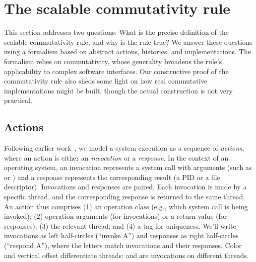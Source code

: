 
\section{The scalable commutativity rule}
\label{sec:rule}

This section addresses two questions: What is the precise
definition of the scalable commutativity rule, and why is the rule true?
%
We answer these questions using a formalism based on abstract actions, histories,
and implementations.
%
The formalism relies on \SRI commutativity, whose generality broadens
the rule's applicability to complex software interfaces.
%
Our constructive proof of the commutativity rule
also sheds some light on how real commutative implementations might be
built, though the actual construction is not very practical.



\subsection{Actions}

Following earlier work~\cite{herlihy:linearizability}, 
we model a system execution
as a sequence of \emph{actions}, where an action is either an
\emph{invocation} or a \emph{response}.
%
In the context of an operating system, an invocation represents a system
call with arguments (such as  or ) and a
response represents the corresponding result (a PID or a file
descriptor).
%
Invocations and responses are paired. Each invocation is made by a
specific thread, and the corresponding response is returned to the same
thread.
%
An action thus comprises (1) an operation class (e.g., which system
call is being invoked); (2) operation arguments (for invocations) or
a return value (for responses); (3) the relevant thread;
and (4) a tag for uniqueness.
%
We'll write invocations as left half-circles 
(``invoke A'') and responses as right half-circles
 (``respond A''), where the letters match
invocations and their responses.
%
Color and vertical offset differentiate threads:
 and  are invocations on
different threads.

\def\historyexample{%
\scpi{A}{1}
\scpi{B}{3}
\scpi{C}{2}
\scpr{A}{1}
\scpr{C}{2}
\scpr{B}{3}
\scpi{D}{1}
\scpr{D}{1}
\scpi{E}{3}
\scpr{E}{3}
\scpi{F}{2}
\scpi{G}{3}
\scpi{H}{1}
\scpr{F}{2}
\scpr{H}{1}
\scpr{G}{3}}

